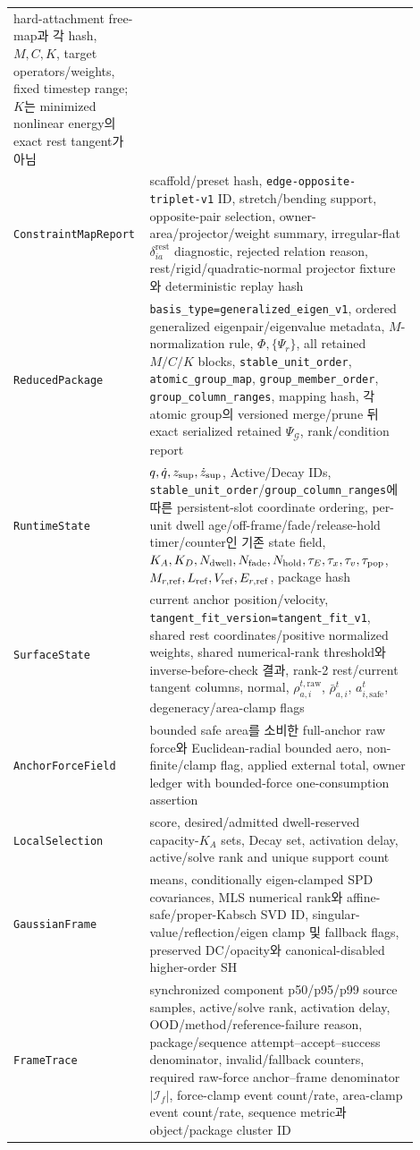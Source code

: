 \documentclass[10pt]{article}
\newcommand{\code}[1]{{\small\nolinkurl{#1}}}
\begin{document}
\begin{longtable}{L{0.25\linewidth}L{0.65\linewidth}}
hard-attachment free-map과 각 hash, \(M,C,K\), target operators/weights, fixed timestep range;
\(K\)는 minimized nonlinear energy의 exact rest tangent가 아님\\
\code{ConstraintMapReport} & scaffold/preset hash, \code{edge-opposite-triplet-v1} ID,
stretch/bending support, opposite-pair selection, owner-area/projector/weight summary,
irregular-flat \(\delta_{ia}^{\mathrm{rest}}\) diagnostic, rejected relation reason,
rest/rigid/quadratic-normal projector fixture와 deterministic replay hash\\
\code{ReducedPackage} & \code{basis\_type=generalized\_eigen\_v1}, ordered generalized
eigenpair/eigenvalue metadata, \(M\)-normalization rule, \(\Phi,\{\Psi_r\}\), all retained
\(M/C/K\) blocks, \code{stable\_unit\_order}, \code{atomic\_group\_map},
\code{group\_member\_order}, \code{group\_column\_ranges}, mapping hash,
각 atomic group의 versioned merge/prune 뒤 exact serialized retained \(\Psi_{\mathcal G}\),
rank/condition report\\
\code{RuntimeState} & \(q,\dot q,z_{\rm sup},\dot z_{\rm sup}\), Active/Decay IDs,
\code{stable\_unit\_order}/\code{group\_column\_ranges}에 따른 persistent-slot coordinate ordering,
per-unit dwell age/off-frame/fade/release-hold timer/counter인 기존 state field,
\(K_A,K_D,N_{\rm dwell},N_{\rm fade},N_{\rm hold},\tau_E,\tau_x,\tau_v,\tau_{\rm pop}\),
\(M_{r,\rm ref},L_{\rm ref},V_{\rm ref},E_{r,\rm ref}\), package hash\\
\code{SurfaceState} & current anchor position/velocity,
\code{tangent\_fit\_version=tangent\_fit\_v1}, shared rest coordinates/positive normalized weights,
shared numerical-rank threshold와 inverse-before-check 결과, rank-2 rest/current tangent columns,
normal, \(\rho_{a,i}^{t,\mathrm{raw}}\), \(\bar\rho_{a,i}^t\),
\(a_{i,\mathrm{safe}}^t\), degeneracy/area-clamp flags\\
\code{AnchorForceField} & bounded safe area를 소비한 full-anchor raw force와 Euclidean-radial bounded aero,
non-finite/clamp flag, applied external total,
owner ledger with bounded-force one-consumption assertion\\
\code{LocalSelection} & score, desired/admitted dwell-reserved capacity-\(K_A\) sets,
Decay set, activation delay, active/solve rank and unique support count\\
\code{GaussianFrame} & means, conditionally eigen-clamped SPD covariances,
MLS numerical rank와 affine-safe/proper-Kabsch SVD ID, singular-value/reflection/eigen clamp 및 fallback flags,
preserved DC/opacity와 canonical-disabled higher-order SH\\
\code{FrameTrace} & synchronized component p50/p95/p99 source samples,
active/solve rank, activation delay, OOD/method/reference-failure reason,
package/sequence attempt--accept--success denominator, invalid/fallback counters,
required raw-force anchor--frame denominator \(|\mathcal I_f|\), force-clamp event count/rate,
area-clamp event count/rate, sequence metric과 object/package cluster ID\\
\bottomrule
\end{longtable}
\end{document}
